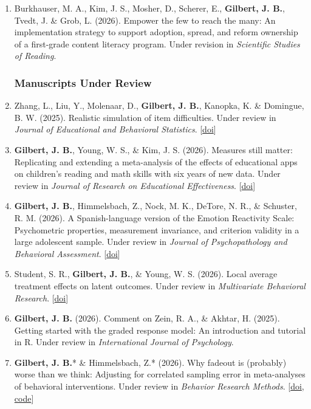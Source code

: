 \documentclass[11pt]{article}
\begin{document}
\begin{enumerate}
\item Burkhauser, M. A., Kim, J. S., Mosher, D., Scherer, E., \textbf{Gilbert, J. B.}, Tvedt, J. \& Grob, L. (2026). Empower the few to reach the many: An implementation strategy to support adoption, spread, and reform ownership of a first-grade content literacy program. Under revision in \textit{Scientific Studies of Reading}. \label{more_ti}

\subsubsection{Manuscripts Under Review}

\item Zhang, L., Liu, Y., Molenaar, D.,\textbf{ Gilbert, J. B.}, Kanopka, K. \& Domingue, B. W. (2025). Realistic simulation of item difficulties. Under review in \textit{Journal of Educational and Behavioral Statistics}. [\href{https://osf.io/preprints/psyarxiv/jbhxy_v4}{doi}]
\item \textbf{Gilbert, J. B.}, Young, W. S., \& Kim, J. S. (2026). Measures still matter: Replicating and extending a meta-analysis of the effects of educational apps on children's reading and math skills with six years of new data. Under review in \textit{Journal of Research on Educational Effectiveness}. [\href{https://edworkingpapers.com/ai26-1579}{doi}] \label{app_meta2}
\item \textbf{Gilbert, J. B.}, Himmelsbach, Z., Nock, M. K., DeTore, N. R., \& Schuster, R. M. (2026). A Spanish-language version of the Emotion Reactivity Scale: Psychometric properties, measurement invariance, and criterion validity in a large adolescent sample. Under review in \textit{Journal of Psychopathology and Behavioral Assessment}. [\href{https://doi.org/10.31234/osf.io/fpzb9_v1}{doi}]
\item Student, S. R., \textbf{Gilbert, J. B.}, \& Young, W. S. (2026). Local average treatment effects on latent outcomes. Under review in \textit{Multivariate Behavioral Research}. [\href{https://osf.io/preprints/psyarxiv/grzu3_v1}{doi}]
\item \textbf{Gilbert, J. B.} (2026). Comment on Zein, R. A., \& Akhtar, H. (2025). Getting started with the graded response model: An introduction and tutorial in R. Under review in \textit{International Journal of Psychology}.
\item \textbf{Gilbert, J. B.}* \& Himmelsbach, Z.* (2026). Why fadeout is (probably) worse than we think: Adjusting for correlated sampling error in meta-analyses of behavioral interventions. Under review in \textit{Behavior Research Methods}. [\href{https://edworkingpapers.com/ai26-1394}{doi}, \href{https://doi.org/10.7910/DVN/X5QCK4}{code}] \label{metareg}

\end{enumerate}
\end{document}
